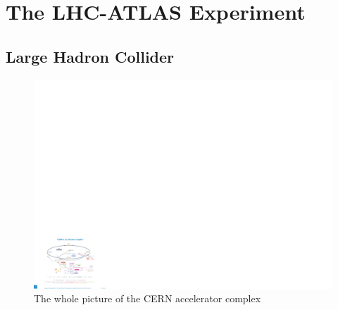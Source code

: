\chapter{The LHC-ATLAS Experiment}
\section{Large Hadron Collider}
\begin{figure}[tbp]
\begin{center}
 \includegraphics[width=1.0\textwidth,keepaspectratio]{figures/detector/CERN}
\caption{
The whole picture of the CERN accelerator complex
}
\label{fig:CERN}
\end{center}
\end{figure}

